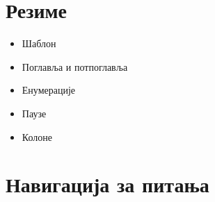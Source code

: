 \documentclass[aspectratio=169]{beamer}
\begin{document}
\section{Резиме}
\begin{frame}{\secname}
    \begin{itemize}
        \item Шаблон
        \item Поглавља и потпоглавља
        \item Енумерације
        \item Паузе
        \item Колоне
    \end{itemize}
\end{frame}

\section*{Навигација за питања}
{\begin{frame}[noframenumbering]{\secname}
    \begin{columns}[t]
        \begin{column}{0.5\linewidth}
            \tableofcontents[sections={2-4}]
        \end{column}
        \begin{column}{0.5\linewidth}
            \tableofcontents[sections={5-}]
        \end{column}
    \end{columns}
\end{frame}}
\end{document}
